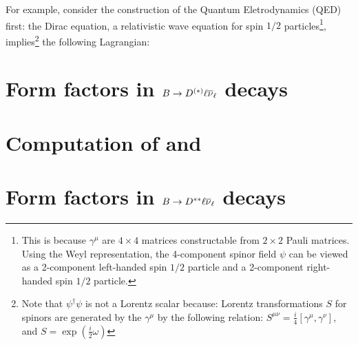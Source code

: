 For example, consider the construction of the Quantum Eletrodynamics (QED)
first:
the Dirac equation, a relativistic wave equation for spin $1/2$ particles\footnote{
    This is because $\gamma^\mu$ are $4 \times 4$ matrices constructable from
    $2 \times 2$ Pauli matrices.
    Using the Weyl representation, the 4-component spinor field $\psi$ can
    be viewed as a 2-component left-handed spin $1/2$ particle and a 2-component
    right-handed spin $1/2$ particle.
}, implies\footnote{
    Note that $\psi^\dagger \psi$ is not a Lorentz scalar because:
    Lorentz transformations $S$ for spinors are generated by
    the $\gamma^\mu$ by the following relation:
    $S^{\mu\nu} = \frac{i}{4}[\gamma^\mu, \gamma^\nu]$,
    and $S = \exp(\frac{i}{2}\omega)$
} the following Lagrangian:




\section{Form factors in $B \rightarrow D^{(*)}\ell{\ensuremath{{\overline{\nu}}_\ell}}$ decays}
\label{ref:theory:ff-d0-dst}


\section{Computation of \RD and \RDst}
\label{ref:theory:rdx}


\section{Form factors in $B \rightarrow D^{**}\ell{\ensuremath{{\overline{\nu}}_\ell}}$ decays}
\label{ref:theory:ff-dstst}
